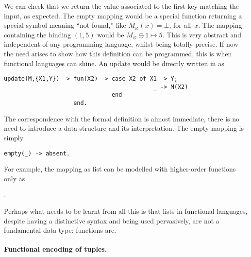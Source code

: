 We can check that we return the value associated to the first key
matching the input, as expected. The empty mapping would be a special
function returning a special symbol meaning ``not found,'' like
\(M_\varnothing(x) = \bot\), for all~\(x\). The mapping containing the
binding \((1,5)\) would be \(M_\varnothing \mathrel{\oplus} 1 \mapsto
5\). This is very abstract and independent of any programming
language, whilst being totally precise. If now the need arises to show
how this definition can be programmed, this is when functional
languages can shine. An update would be directly written in \Erlang as
\begin{verbatim}
update(M,{X1,Y}) -> fun(X2) -> case X2 of X1 -> Y; 
                                           _ -> M(X2) 
                               end
                    end.
\end{verbatim}
The correspondence with the formal definition is almost immediate,
there is no need to introduce a data structure and its
interpretation. The empty mapping is simply
\begin{verbatim}
empty(_) -> absent.
\end{verbatim}
For example, the mapping as list \erlcode{[\{a,0\},\{b,1\},\{a,5\}]}
can be modelled with higher\hyp{}order functions only as
\begin{center}
.
\end{center}
Perhaps what needs to be learnt from all this is that lists in
functional languages, despite having a distinctive syntax and being
used pervasively, are not a fundamental data type: functions are.

\medskip

\paragraph{Functional encoding of tuples.}

